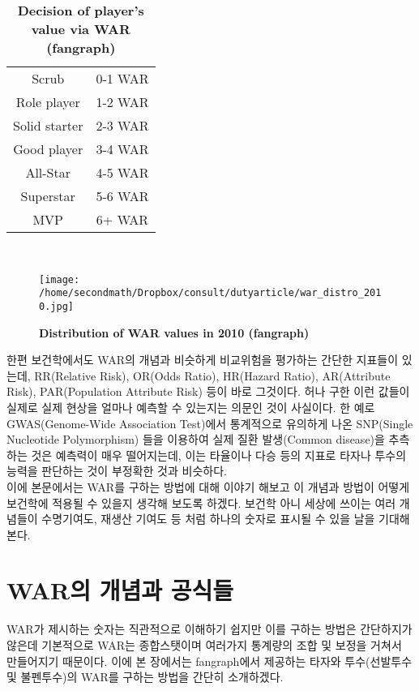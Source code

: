 \documentclass[11pt]{article}
\begin{document}
\begin{table}
\centering
\begin{tabular}{|c|c|}
\hline
Scrub & 0-1 WAR\\ 
Role player & 1-2 WAR\\ 
Solid starter & 2-3 WAR\\ 
Good player & 3-4 WAR \\ 
All-Star & 4-5 WAR \\ 
Superstar &  5-6 WAR\\ 
MVP & 6+ WAR\\ \hline
\end{tabular}\\
\caption{\bf{Decision of player's value via WAR (fangraph)}}
\label{tb1}
\end{table}

\begin{figure}[!hbp]
\centering
\texttt{[image: /home/secondmath/Dropbox/consult/dutyarticle/war\_distro\_2010.jpg]}
\caption{\bf {Distribution of WAR values in 2010 (fangraph)}}
\label{fig1}
\end{figure}


한편 보건학에서도 WAR의 개념과 비슷하게 비교위험을 평가하는 간단한 지표들이 있는데, RR(Relative Risk), OR(Odds Ratio), HR(Hazard Ratio), AR(Attribute Risk), PAR(Population Attribute Risk) 등이 바로 그것이다. 허나 구한 이런 값들이 실제로 실제 현상을 얼마나 예측할 수 있는지는 의문인 것이 사실이다. 한 예로 GWAS(Genome-Wide Association Test)에서 통계적으로 유의하게 나온 SNP(Single Nucleotide Polymorphism) 들을 이용하여 실제 질환 발생(Common disease)을 추측하는 것은 예측력이 매우 떨어지는데, 이는 타율이나 다승 등의 지표로 타자나 투수의 능력을 판단하는 것이 부정확한 것과 비슷하다\cite{janssens2008genome}.\\
이에 본문에서는 WAR를 구하는 방법에 대해 이야기 해보고 이 개념과 방법이 어떻게 보건학에 적용될 수 있을지 생각해 보도록 하겠다. 보건학 아니 세상에 쓰이는 여러 개념들이 수명기여도, 재생산 기여도 등 처럼 하나의 숫자로 표시될 수 있을 날을 기대해 본다. 



\section{WAR의 개념과 공식들}\label{previous work}
WAR가 제시하는 숫자는 직관적으로 이해하기 쉽지만 이를 구하는 방법은 간단하지가 않은데 기본적으로 WAR는 종합스탯이며 여러가지 통계량의 조합 및 보정을 거쳐서 만들어지기 때문이다. 이에 본 장에서는 fangraph에서 제공하는 타자와 투수(선발투수 및 불펜투수)의 WAR를 구하는 방법을 간단히 소개하겠다. 
\end{document}

